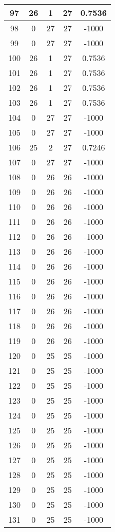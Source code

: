 \documentclass[letterpaper, 12pt]{article}
\begin{document}
\begin{longtable}{|c|c|c|c|c|}
\hline
97 & 26 & 1 & 27 & 0.7536 \\
\hline
98 & 0 & 27 & 27 & -1000 \\
\hline
99 & 0 & 27 & 27 & -1000 \\
\hline
100 & 26 & 1 & 27 & 0.7536 \\
\hline
101 & 26 & 1 & 27 & 0.7536 \\
\hline
102 & 26 & 1 & 27 & 0.7536 \\
\hline
103 & 26 & 1 & 27 & 0.7536 \\
\hline
104 & 0 & 27 & 27 & -1000 \\
\hline
105 & 0 & 27 & 27 & -1000 \\
\hline
106 & 25 & 2 & 27 & 0.7246 \\
\hline
107 & 0 & 27 & 27 & -1000 \\
\hline
108 & 0 & 26 & 26 & -1000 \\
\hline
109 & 0 & 26 & 26 & -1000 \\
\hline
110 & 0 & 26 & 26 & -1000 \\
\hline
111 & 0 & 26 & 26 & -1000 \\
\hline
112 & 0 & 26 & 26 & -1000 \\
\hline
113 & 0 & 26 & 26 & -1000 \\
\hline
114 & 0 & 26 & 26 & -1000 \\
\hline
115 & 0 & 26 & 26 & -1000 \\
\hline
116 & 0 & 26 & 26 & -1000 \\
\hline
117 & 0 & 26 & 26 & -1000 \\
\hline
118 & 0 & 26 & 26 & -1000 \\
\hline
119 & 0 & 26 & 26 & -1000 \\
\hline
120 & 0 & 25 & 25 & -1000 \\
\hline
121 & 0 & 25 & 25 & -1000 \\
\hline
122 & 0 & 25 & 25 & -1000 \\
\hline
123 & 0 & 25 & 25 & -1000 \\
\hline
124 & 0 & 25 & 25 & -1000 \\
\hline
125 & 0 & 25 & 25 & -1000 \\
\hline
126 & 0 & 25 & 25 & -1000 \\
\hline
127 & 0 & 25 & 25 & -1000 \\
\hline
128 & 0 & 25 & 25 & -1000 \\
\hline
129 & 0 & 25 & 25 & -1000 \\
\hline
130 & 0 & 25 & 25 & -1000 \\
\hline
131 & 0 & 25 & 25 & -1000 \\

\end{longtable}
\end{document}
